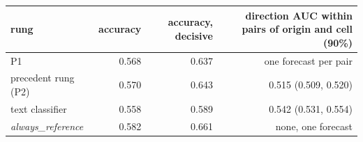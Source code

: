 \begin{tabular}{lrrr}
\toprule
rung & accuracy & accuracy, decisive & direction AUC within pairs of origin and cell (90\%) \\
\midrule
P1 & 0.568 & 0.637 & one forecast per pair \\
precedent rung (P2) & 0.570 & 0.643 & 0.515 (0.509, 0.520) \\
text classifier & 0.558 & 0.589 & 0.542 (0.531, 0.554) \\
\emph{always\_reference} & 0.582 & 0.661 & none, one forecast \\
\bottomrule
\end{tabular}

